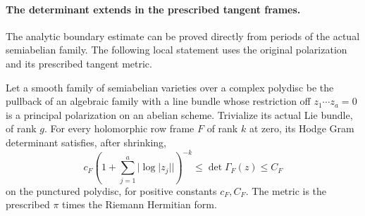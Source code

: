 \paragraph{The determinant extends in the prescribed tangent frames.}
The analytic boundary estimate can be proved directly from periods
of the actual semiabelian family. The following local statement uses
the original polarization and its prescribed tangent metric.

\begin{lemma}\label{geo-boundary-gram}
Let a smooth family of semiabelian varieties over a complex
polydisc be the pullback of an algebraic family with a line bundle
whose restriction off $z_1\cdots z_a=0$ is a principal polarization
on an abelian scheme. Trivialize its actual Lie bundle, of rank $g$.
For every holomorphic row frame $F$ of rank $k$ at zero, its Hodge
Gram determinant satisfies, after shrinking,
\[
 c_F\left(1+\sum_{j=1}^a|\log|z_j||\right)^{-k}
              \le \det\Gamma_F(z)\le C_F
\]
on the punctured polydisc, for positive constants $c_F,C_F$.
The metric is the prescribed $\pi$ times the Riemann Hermitian form.
\end{lemma}
